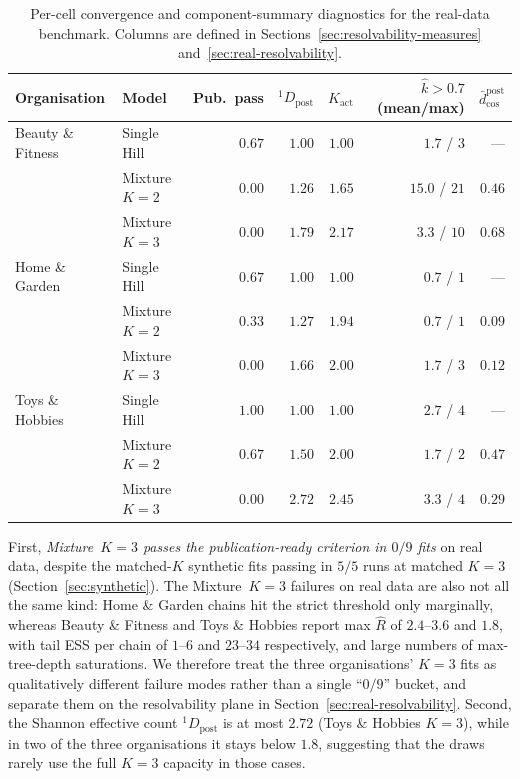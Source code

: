 \documentclass[11pt]{article}
\begin{document}
\begin{table}[ht]
\centering
\caption{Per-cell convergence and component-summary diagnostics for the real-data benchmark. Columns are defined in Sections~\ref{sec:resolvability-measures} and~\ref{sec:real-resolvability}.}
\label{tab:real_convergence}
\small
\begin{tabular}{llrrrrr}
\toprule
Organisation & Model & Pub.\ pass & $^1\!D_{\text{post}}$ & $K_{\text{act}}$ & $\hat k > 0.7$ (mean/max) & $\bar{d}_{\cos}^{\text{post}}$ \\
\midrule
Beauty \& Fitness  & Single Hill    & $0.67$ & $1.00$ & $1.00$ & $1.7$ / $3$  & --- \\
                   & Mixture $K=2$ & $0.00$ & $1.26$ & $1.65$ & $15.0$ / $21$ & $0.46$ \\
                   & Mixture $K=3$ & $0.00$ & $1.79$ & $2.17$ & $3.3$ / $10$  & $0.68$ \\
\addlinespace
Home \& Garden     & Single Hill    & $0.67$ & $1.00$ & $1.00$ & $0.7$ / $1$ & --- \\
                   & Mixture $K=2$ & $0.33$ & $1.27$ & $1.94$ & $0.7$ / $1$ & $0.09$ \\
                   & Mixture $K=3$ & $0.00$ & $1.66$ & $2.00$ & $1.7$ / $3$ & $0.12$ \\
\addlinespace
Toys \& Hobbies    & Single Hill    & $1.00$ & $1.00$ & $1.00$ & $2.7$ / $4$ & --- \\
                   & Mixture $K=2$ & $0.67$ & $1.50$ & $2.00$ & $1.7$ / $2$ & $0.47$ \\
                   & Mixture $K=3$ & $0.00$ & $2.72$ & $2.45$ & $3.3$ / $4$ & $0.29$ \\
\bottomrule
\end{tabular}
\end{table}

First, \emph{Mixture~$K=3$ passes the publication-ready criterion in $0/9$ fits} on real data, despite the matched-$K$ synthetic fits passing in $5/5$ runs at matched $K=3$ (Section~\ref{sec:synthetic}). The Mixture~$K=3$ failures on real data are also not all the same kind: Home \& Garden chains hit the strict threshold only marginally, whereas Beauty \& Fitness and Toys \& Hobbies report max $\widehat{R}$ of $2.4$--$3.6$ and $1.8$, with tail ESS per chain of $1$--$6$ and $23$--$34$ respectively, and large numbers of max-tree-depth saturations. We therefore treat the three organisations' $K=3$ fits as qualitatively different failure modes rather than a single ``$0/9$'' bucket, and separate them on the resolvability plane in Section~\ref{sec:real-resolvability}. Second, the Shannon effective count $^1\!D_{\text{post}}$ is at most $2.72$ (Toys \& Hobbies $K=3$), while in two of the three organisations it stays below $1.8$, suggesting that the draws rarely use the full $K=3$ capacity in those cases.
\end{document}
